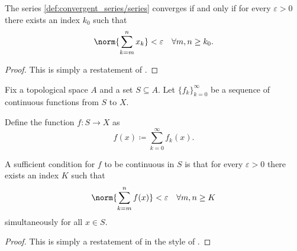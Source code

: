 \begin{proposition}\label{thm:cauchy_series_convergence_criterion}\mcite\cite[3.22]{Rudin1976}
  The series \eqref{def:convergent_series/series} converges if and only if for every \( \varepsilon > 0 \) there exists an index \( k_0 \) such that
  \begin{equation*}
    \norm{\sum_{k=m}^n x_k} < \varepsilon \quad\forall m, n \geq k_0.
  \end{equation*}
\end{proposition}
\begin{proof}
  This is simply a restatement of .
\end{proof}

\begin{proposition}\label{thm:cauchy_series_continuity_criterion}\mcite\cite[]{Фихтенгольц1968/2}
  Fix a topological space \( A \) and a set \( S \subseteq A \). Let \( \{ f_k \}_{k=0}^\infty \) be a sequence of continuous functions from \( S \) to \( X \).

  Define the function \( f: S \to X \) as
  \begin{equation}\label{thm:cauchy_series_continuity_criterion/function}
    f(x) \coloneqq \sum_{k=0}^\infty f_k(x).
  \end{equation}

  A sufficient condition for \( f \) to be continuous in \( S \) is that for every \( \varepsilon > 0 \) there exists an index \( K \) such that
  \begin{equation*}
    \norm{\sum_{k=m}^n f(x)} < \varepsilon \quad\forall m, n \geq K
  \end{equation*}
  simultaneously for all \( x \in S \).
\end{proposition}
\begin{proof}
  This is simply a restatement of  in the style of .
\end{proof}

